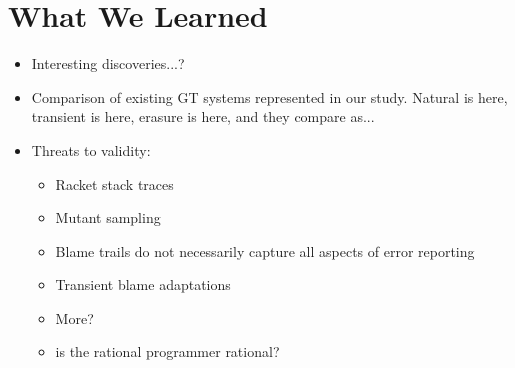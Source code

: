 \section{What We Learned}

\begin{itemize}
  \item Interesting discoveries...?

  \item Comparison of existing GT systems represented in our study.  
    Natural is here, transient is here, erasure is here, and they
        compare as...

      \item Threats to validity:
        \begin{itemize}
          \item Racket stack traces
          \item Mutant sampling
          \item Blame trails do not necessarily capture all aspects of error reporting
          \item Transient blame adaptations
          \item More?

	  \item is the rational programmer rational? 

        \end{itemize}
\end{itemize}        



